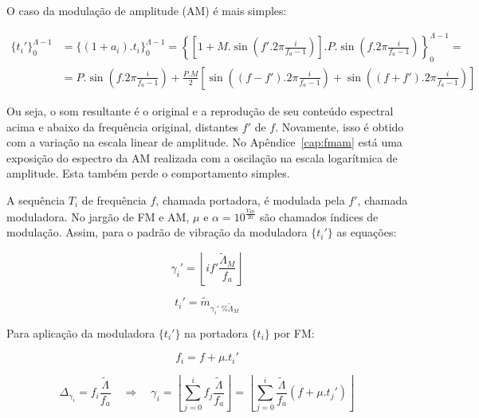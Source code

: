 O caso da modulação de amplitude (AM) é mais simples:

\begin{equation}\label{eq:amEsp}
\begin{split}
\{t_i'\}_0^{\Lambda-1} & =\{(1+a_i) . t_i\}_0^{\Lambda-1}= \left \{ \left [ 1+M.\sin \left ( f'.2\pi\frac{i}{f_a -1} \right ) \right] . P .\sin \left ( f.2\pi\frac{i}{f_a -1} \right ) \right \}_0^{\Lambda-1} = \\
& = P.\sin \left( f.2\pi\frac{i}{f_a -1}  \right ) + \frac{P.M}{2} \left [ \sin \left( (f-f').2\pi\frac{i}{f_a -1}  \right ) + \sin \left( (f+f').2\pi\frac{i}{f_a -1}  \right ) \right ]
\end{split}
\end{equation}

Ou seja, o som resultante é o original
e a reprodução de seu conteúdo espectral acima e abaixo da frequência
original, distantes $f'$ de $f$. Novamente, isso é obtido com a variação na escala linear de amplitude. No Apêndice~\ref{cap:fmam} está uma exposição do espectro da AM realizada com a oscilação na escala logarítmica de amplitude. Esta também perde o comportamento simples.

A sequência $T_i$ de frequência $f$, chamada portadora, é modulada pela $f'$, chamada moduladora. No jargão de FM e AM, $\mu$ e $\alpha=10^{\frac{V_{dB}}{20}}$ são chamados índices de modulação. Assim, 
para o padrão de vibração da moduladora $\{t_i'\}$ as equações:

\begin{equation}\label{fmGammaAux}
\gamma_i'=\left \lfloor i f' \frac{\widetilde{\Lambda}_M}{f_a} \right \rfloor
\end{equation}

\begin{equation}\label{fmAux}
t_i'=\widetilde{m}_{\gamma_i' \;\% \widetilde{\Lambda}_M}
\end{equation}

Para aplicação da moduladora $\{t_i'\}$ na portadora $\{t_i\}$
por FM:

\begin{equation}\label{fmF}
f_i=f + \mu . t_i'
\end{equation}

\begin{equation}\label{fmGamma}
\Delta_{\gamma_i}=f_i\frac{\widetilde{\Lambda}}{f_a} \quad \Rightarrow \quad \gamma_i = \left \lfloor \sum_{j=0}^{i} f_j \frac{\widetilde{\Lambda}}{f_a} \right \rfloor = \left \lfloor \sum_{j=0}^{i} \frac{\widetilde{\Lambda}}{f_a}(f+\mu . t_j') \right\rfloor
\end{equation}

